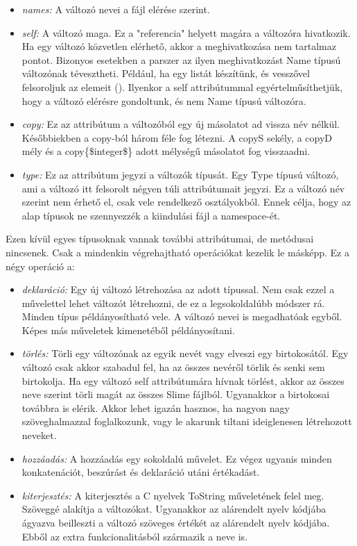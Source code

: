 \begin{itemize}
\item \emph{names:} 
A változó nevei a fájl elérése szerint.
\item \emph{self:} 
A változó maga. 
Ez a "referencia" helyett magára a változóra hivatkozik.
Ha egy változó közvetlen elérhető, akkor a meghivatkozása nem tartalmaz pontot.
Bizonyos esetekben a parszer az ilyen meghivatkozást Name típusú változónak tévesztheti.
Például, ha egy listát készítünk, és vesszővel felsoroljuk az elemeit ().
Ilyenkor a self attribútummal egyértelműsíthetjük, hogy a változó elérésre gondoltunk, és nem Name típusú változóra. 
\item \emph{copy:}
Ez az attribútum a változóból egy új másolatot ad vissza név nélkül.
Későbbiekben a copy-ból három féle fog létezni. 
A copyS sekély, a copyD mély és a copy\{\$integer\$\} adott mélységű másolatot fog visszaadni.
\item \emph{type:}
Ez az attribútum jegyzi a változók típusát.
Egy Type típusú változó, ami a változó itt felsorolt négyen túli attribútumait jegyzi.
Ez a változó név szerint nem érhető el, csak vele rendelkező osztályokból.
Ennek célja, hogy az alap típusok ne szennyezzék a kiindulási fájl a namespace-ét.
\end{itemize}

Ezen kívül egyes típusoknak vannak további attribútumai, de metódusai nincsenek. 
Csak a mindenkin végrehajtható operációkat kezelik le másképp. 
Ez a négy operáció a:
\begin{itemize}
\item \emph{deklaráció:} 
Egy új változó létrehozása az adott típussal.
Nem csak ezzel a művelettel lehet változót létrehozni, de ez a legsokoldalúbb módszer rá.
Minden típus példányosítható vele.
A változó nevei is megadhatóak egyből.
Képes más műveletek kimenetéből példányosítani.
\item \emph{törlés:} 
Törli egy változónak az egyik nevét vagy elveszi egy birtokosától.
Egy változó csak akkor szabadul fel, ha az összes nevéről törlik és senki sem birtokolja.
Ha egy változó self attribútumára hívnak törlést, akkor az összes neve szerint törli magát az összes Slime fájlból.
Ugyanakkor a birtokosai továbbra is elérik.
Akkor lehet igazán hasznos, ha nagyon nagy szöveghalmazzal foglalkozunk, vagy le akarunk tiltani ideiglenesen létrehozott neveket.
\item \emph{hozzáadás:}
A hozzáadás egy sokoldalú művelet. 
Ez végez ugyanis minden konkatenációt, beszúrást és deklaráció utáni értékadást.
\item \emph{kiterjesztés:}
A kiterjesztés a C nyelvek ToString műveletének felel meg. 
Szöveggé alakítja a változókat.
Ugyanakkor az alárendelt nyelv kódjába ágyazva beilleszti a változó szöveges értékét az alárendelt nyelv kódjába. 
Ebből az extra funkcionalitásból származik a neve is.
\end{itemize}

